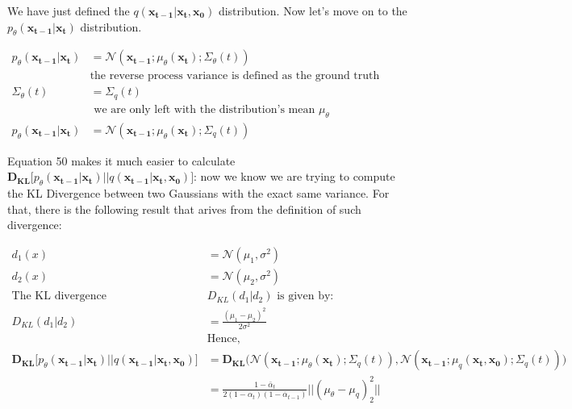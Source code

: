 \documentclass{article}
\begin{document}
We have just defined the $q(\mathbf{x_{t-1} | x_t,  x_0})$ distribution. Now let's move on to the  $p_\theta (\mathbf{x_{t-1} | x_t})$ distribution.
	
\begin{align}
	p_\theta(\mathbf{x_{t-1} | x_t}) &=   \mathcal{N}(\mathbf{x_{t-1}};  \mu_\theta(\mathbf{x_t}); \Sigma_\theta(t)) \\
	& \text{the reverse process variance is defined as the ground truth variance of the forward process: } \\
 \Sigma_\theta(t) &= \Sigma_q(t) \\
	& \text{    we are only left with the distribution's mean   } \mu_\theta \\
	p_\theta(\mathbf{x_{t-1} | x_t}) &=   \mathcal{N}(\mathbf{x_{t-1}};  \mu_\theta(\mathbf{x_t}); \Sigma_q(t))
\end{align}

Equation 50 makes it much easier to calculate $\mathbf{D_{KL}}\big[ p_\theta (\mathbf{x_{t-1} | x_t})  || q(\mathbf{x_{t-1} | x_t,  x_0}) \big]$: now we know we are trying to compute the KL Divergence between two Gaussians with the exact same variance. For that,  there is the following result that arives from the definition of such divergence:

\begin{align}
	d_1(x) &= \mathcal{N}(\mu_1, \sigma^2)  \\
	d_2(x) &= \mathcal{N}(\mu_2, \sigma^2) \\
	\text{The KL divergence   } & D_{KL}(d_1 | d_2)  \text{   is given by:} \\
	D_{KL}(d_1 | d_2) &= \frac{(\mu_1 - \mu_2)^2}{2\sigma^2}\\
	&\text{Hence,  }\\
\mathbf{D_{KL}}\big[ p_\theta (\mathbf{x_{t-1} | x_t})  || q(\mathbf{x_{t-1} | x_t,  x_0}) \big] &=  \mathbf{D_{KL}}\big(   \mathcal{N}(\mathbf{x_{t-1}};  \mu_\theta(\mathbf{x_t}); \Sigma_q(t)), \mathcal{N}(\mathbf{x_{t-1}};  \mu_q(\mathbf{x_t, x_0}); \Sigma_q(t)) \big) \\
&=  \frac{1- \bar{\alpha}_t }{2(1-\alpha_t)(1- \bar\alpha_{t-1})} \big|\big| (\mu_\theta - \mu_q)^2_2\big|\big|
\end{align}
\end{document}
